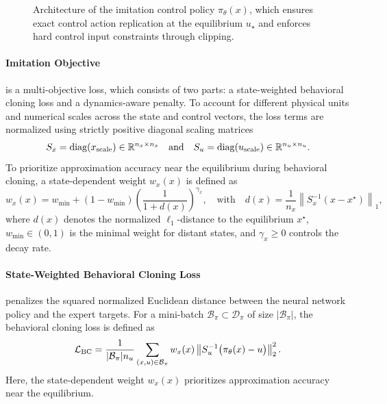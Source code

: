 \begin{figure}[htbp]
    \centering
    
    \caption[Imitation policy architecture]{
        Architecture of the imitation control policy $\pi_\theta(x)$, which ensures exact control action replication 
        at the equilibrium $u_\star$ and enforces hard control input constraints through clipping.}
    \label{fig:imitation-policy}
\end{figure}


\paragraph{Imitation Objective} is a multi-objective loss, which consists of two parts: a state-weighted behavioral cloning loss 
and a dynamics-aware penalty. 
To account for different physical units and numerical scales across the state and control vectors, 
the loss terms are normalized using strictly positive diagonal scaling matrices
\begin{equation}
    S_x = \operatorname{diag}(x_{\mathrm{scale}}) \in \mathbb{R}^{n_x \times n_x}
    \quad \text{and} \quad
    S_u = \operatorname{diag}(u_{\mathrm{scale}}) \in \mathbb{R}^{n_u \times n_u}.
\end{equation}
To prioritize approximation accuracy near the equilibrium during behavioral cloning, a state-dependent weight $w_x(x)$ is defined as
\begin{equation}
    \label{eq:state-weight}
    w_x(x) = w_{\min} + (1 - w_{\min}) \left( \frac{1}{1 + d(x)} \right)^{\gamma_x}, 
    \quad \text{with} \quad
    d(x) = \frac{1}{n_x} \left\| S_x^{-1}(x - x^\star) \right\|_1,
\end{equation}
where $d(x)$ denotes the normalized $\ell_1$-distance to the equilibrium $x^\star$, $w_{\min} \in (0, 1)$ is the 
minimal weight for distant states, and $\gamma_x \geq 0$ controls the decay rate.

\paragraph{State-Weighted Behavioral Cloning Loss} penalizes the squared normalized 
Euclidean distance between the neural network policy and the expert targets. 
For a mini-batch $\mathcal{B}_\pi \subset \mathcal{D}_\pi$ of size 
$|\mathcal{B}_\pi|$, the behavioral cloning loss is defined as
\begin{equation}
    \label{eq:state-weighted-loss}
    \mathcal{L}_{\mathrm{BC}} = \frac{1}{|\mathcal{B}_\pi| n_u} 
    \sum_{(x, u) \in \mathcal{B}_\pi} w_x(x) \left\| 
        S_u^{-1} \big( \pi_\theta(x) - u \big) 
    \right\|_2^2.
\end{equation}
Here, the state-dependent weight $w_x(x)$ prioritizes approximation accuracy near the equilibrium.


